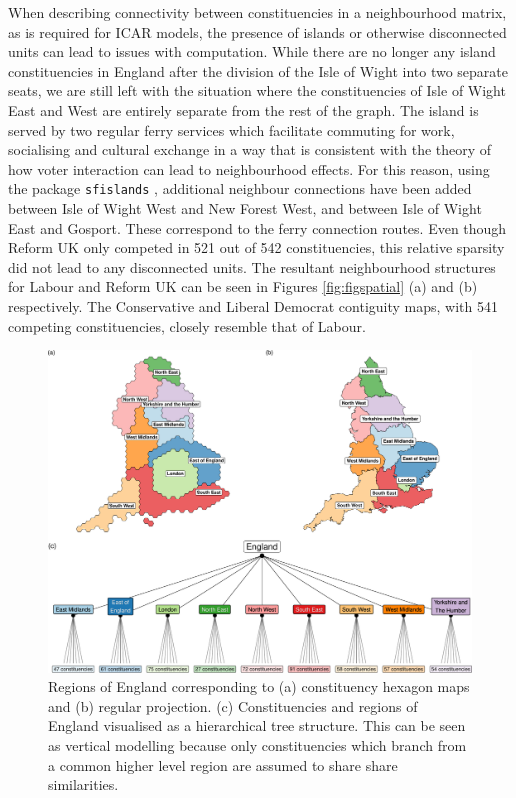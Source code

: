 \documentclass[webpdf,large,contemporary,namedate]{oup-authoring-template}
\theoremstyle{thmstyleone}
\theoremstyle{thmstyletwo}
\theoremstyle{thmstylethree}
\begin{document}
When describing connectivity between constituencies in a neighbourhood
matrix, as is required for ICAR models, the presence of islands or
otherwise disconnected units can lead to issues with computation. While
there are no longer any island constituencies in England after the
division of the Isle of Wight into two separate seats, we are still left
with the situation where the constituencies of Isle of Wight East and
West are entirely separate from the rest of the graph. The island is
served by two regular ferry services which facilitate commuting for
work, socialising and cultural exchange in a way that is consistent with
the theory of how voter interaction can lead to neighbourhood effects.
For this reason, using the package \texttt{sfislands}
\citep{sfislands2024}, additional neighbour connections have been added
between Isle of Wight West and New Forest West, and between Isle of
Wight East and Gosport. These correspond to the ferry connection routes.
Even though Reform UK only competed in 521 out of 542 constituencies,
this relative sparsity did not lead to any disconnected units. The
resultant neighbourhood structures for Labour and Reform UK can be seen
in Figures \ref{fig:figspatial} (a) and (b) respectively. The
Conservative and Liberal Democrat contiguity maps, with 541 competing
constituencies, closely resemble that of Labour.

\begin{figure}[th]

{\centering \includegraphics[width=0.9\linewidth]{jrss_resubmission_files/figure-latex/figregionstree-1} 

}

\caption{Regions of England corresponding to (a) constituency hexagon maps and (b) regular projection. (c) Constituencies and regions of England visualised as a hierarchical tree structure. This can be seen as vertical modelling because only constituencies which branch from a common higher level region are assumed to share share similarities.}\label{fig:figregionstree}
\end{figure}
\end{document}
